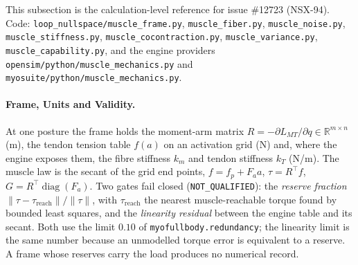 \documentclass[11pt,a4paper]{article}
\begin{document}
This subsection is the calculation-level reference for issue \#12723 (NSX-94).
Code: \texttt{loop\_nullspace/muscle\_frame.py}, \texttt{muscle\_fiber.py},
\texttt{muscle\_noise.py}, \texttt{muscle\_stiffness.py},
\texttt{muscle\_cocontraction.py}, \texttt{muscle\_variance.py},
\texttt{muscle\_capability.py}, and the engine providers
\texttt{opensim/python/muscle\_mechanics.py} and
\texttt{myosuite/python/muscle\_mechanics.py}.

\paragraph{Frame, Units and Validity.}  At one posture the frame holds the
moment-arm matrix $R=-\partial L_{MT}/\partial q\in\mathbb{R}^{m\times n}$ (m),
the tendon tension table $f(a)$ on an activation grid (N) and, where the engine
exposes them, the fibre stiffness $k_m$ and tendon stiffness $k_T$ (N/m).  The
muscle law is the secant of the grid end points,
$f=f_p+F_a a$, $\tau=R^{\top}f$, $G=R^{\top}\operatorname{diag}(F_a)$.  Two
gates fail closed (\texttt{NOT\_QUALIFIED}): the \emph{reserve fraction}
$\lVert\tau-\tau_{\mathrm{reach}}\rVert/\lVert\tau\rVert$, with
$\tau_{\mathrm{reach}}$ the nearest muscle-reachable torque found by bounded
least squares, and the \emph{linearity residual} between the engine table and
its secant.  Both use the limit $0.10$ of \texttt{myofullbody.redundancy}; the
linearity limit is the same number because an unmodelled torque error is
equivalent to a reserve.  A frame whose reserves carry the load produces no
numerical record.
\end{document}
